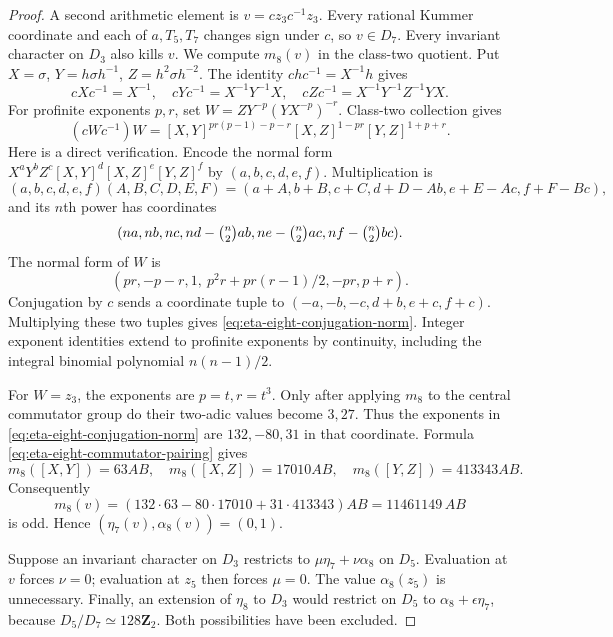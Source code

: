 \begin{proof}
A second arithmetic element is $v=cz_3c^{-1}z_3$.
Every rational Kummer coordinate and each of $a,T_5,T_7$ changes
sign under $c$, so $v\in D_7$. Every invariant character on $D_3$
also kills $v$. We compute $m_8(v)$ in the class-two quotient.
Put $X=\sigma$, $Y=h\sigma h^{-1}$, $Z=h^2\sigma h^{-2}$.
The identity $chc^{-1}=X^{-1}h$ gives
\[
 cXc^{-1}=X^{-1},\quad
 cYc^{-1}=X^{-1}Y^{-1}X,\quad
 cZc^{-1}=X^{-1}Y^{-1}Z^{-1}YX.
\]
For profinite exponents $p,r$, set $W=ZY^{-p}(YX^{-p})^{-r}$.
Class-two collection gives
\begin{equation}\label{eq:eta-eight-conjugation-norm}
 (cWc^{-1})W=[X,Y]^{pr(p-1)-p-r}
                  [X,Z]^{1-pr}[Y,Z]^{1+p+r}.
\end{equation}
Here is a direct verification. Encode the normal form
$X^aY^bZ^c[X,Y]^d[X,Z]^e[Y,Z]^f$ by $(a,b,c,d,e,f)$.
Multiplication is
\[
 (a,b,c,d,e,f)(A,B,C,D,E,F)
 =(a+A,b+B,c+C,d+D-Ab,e+E-Ac,f+F-Bc),
\]
and its $n$th power has coordinates
\[
 (na,nb,nc,nd-\tbinom n2ab,
             ne-\tbinom n2ac,nf-\tbinom n2bc).
\]
The normal form of $W$ is
\[
 (pr,-p-r,1,\ p^2r+pr(r-1)/2,-pr,p+r).
\]
Conjugation by $c$ sends a coordinate tuple to
$(-a,-b,-c,d+b,e+c,f+c)$. Multiplying these two tuples gives
\eqref{eq:eta-eight-conjugation-norm}. Integer exponent identities
extend to profinite exponents by continuity, including the integral
binomial polynomial $n(n-1)/2$.

For $W=z_3$, the exponents are $p=t,r=t^3$. Only after applying
$m_8$ to the central commutator group do their two-adic values become
$3,27$. Thus the exponents in \eqref{eq:eta-eight-conjugation-norm}
are $132,-80,31$ in that coordinate. Formula
\eqref{eq:eta-eight-commutator-pairing} gives
\[
 m_8([X,Y])=63AB,\quad m_8([X,Z])=17010AB,\quad
 m_8([Y,Z])=413343AB.
\]
Consequently
\[
 m_8(v)=(132\cdot63-80\cdot17010+31\cdot413343)AB
       =11461149\,AB
\]
is odd. Hence $(\eta_7(v),\alpha_8(v))=(0,1)$.

Suppose an invariant character on $D_3$ restricts to
$\mu\eta_7+\nu\alpha_8$ on $D_5$. Evaluation at $v$ forces
$\nu=0$; evaluation at $z_5$ then forces $\mu=0$.
The value $\alpha_8(z_5)$ is unnecessary. Finally, an extension
of $\eta_8$ to $D_3$ would restrict on $D_5$ to
$\alpha_8+\epsilon\eta_7$, because $D_5/D_7\simeq128\mathbf Z_2$.
Both possibilities have been excluded.
\end{proof}

